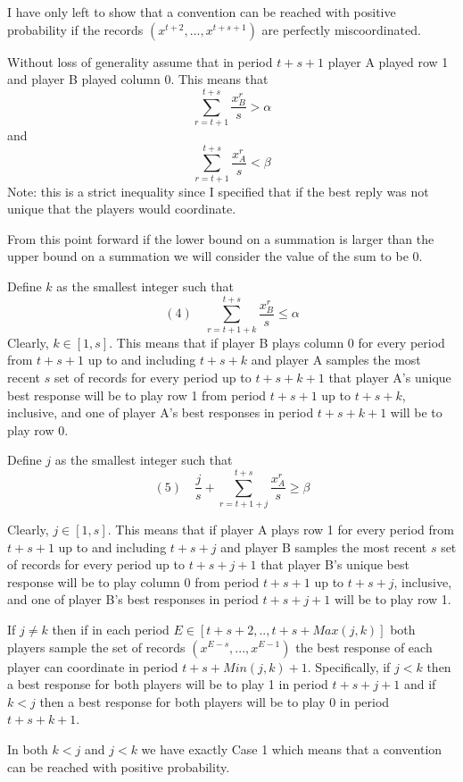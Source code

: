 \documentclass{article}
\begin{document}
I have only left to show that a convention can be reached with positive probability if the records $(x^{t+2},...,x^{t+s+1})$ are perfectly miscoordinated.

Without loss of generality assume that in period $t+s+1$ player A played row 1 and player B played column 0. This means that 
$$\sum\limits_{r=t+1}^{t+s} \frac{x^r_B}{s} > \alpha$$
and
$$\sum\limits_{r=t+1}^{t+s} \frac{x^r_A}{s} < \beta$$
Note: this is a strict inequality since I specified that if the best reply was not unique that the players would coordinate.

From this point forward if the lower bound on a summation is larger than the upper bound on a summation we will consider the value of the sum to be 0.

Define $k$ as the smallest integer such that 
$$(4) \hspace{12pt} \sum\limits_{r=t+1+k}^{t+s} \frac{x^r_B}{s} \leq \alpha$$
Clearly, $k \in [1,s]$. This means that if player B plays column 0 for every period from $t+s+1$ up to and including $t+s+k$ and player A samples the most recent $s$ set of records for every period up to $t+s+k+1$ that player A's unique best response will be to play row 1 from period $t+s+1$ up to $t+s+k$, inclusive, and one of player A's best responses in period $t+s+k+1$ will be to play row 0.

Define $j$ as the smallest integer such that
$$(5) \hspace{12pt} \frac{j}{s}+\sum\limits_{r=t+1+j}^{t+s} \frac{x^r_A}{s} \geq \beta$$

Clearly, $j \in [1,s]$. This means that if player A plays row 1 for every period from $t+s+1$ up to and including $t+s+j$ and player B samples the most recent $s$ set of records for every period up to $t+s+j+1$ that player B's unique best response will be to play column 0 from period $t+s+1$ up to $t+s+j$, inclusive, and one of player B's best responses in period $t+s+j+1$ will be to play row 1.
\vskip6pt

If $j \neq k$ then if in each period $E \in [t+s+2,..,t+s+Max(j,k)]$ both players sample the set of records $(x^{E-s},...,x^{E-1})$ the best response of each player can coordinate in period $t+s+Min(j,k)+1$. Specifically, if $j<k$ then a best response for both players will be to play 1 in period $t+s+j+1$ and if $k<j$ then a best response for both players will be to play 0 in period $t+s+k+1$.

In both $k<j$ and $j<k$ we have exactly Case 1 which means that a convention can be reached with  positive probability.
\vskip6pt
\end{document}
